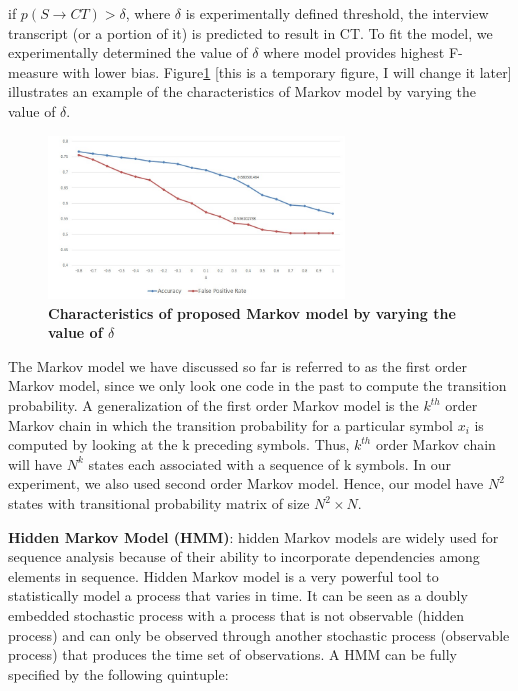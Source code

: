 \documentclass{amia}
\begin{document}
if $p(S\rightarrow CT) > \delta $, where $\delta$ is experimentally defined threshold, the interview transcript (or a portion of it) is predicted to result in CT. To fit the model, we experimentally determined the value of $\delta$ where model provides highest F-measure with lower bias. Figure\ref{fig:delta} [this is a temporary figure, I will change it later] illustrates an example of the characteristics of Markov model by varying the value of $\delta$. 

\begin{figure}[htb!]
    \centering
    \includegraphics[width=0.70\textwidth]{figures/deltadata.png}
    \caption{\textbf{Characteristics of proposed Markov model by varying the value of $\delta$}}
    \label{fig:delta}
\end{figure}

The Markov model we have discussed so far is referred to as the first order Markov model, since we only look one code in the past to compute the transition probability. A generalization of the first order Markov model is the $k^{th}$ order Markov chain in which the transition probability for a particular symbol $x_i$ is computed by looking at the k preceding symbols. Thus, $k^{th}$ order Markov chain will have $N^{k}$ states each associated with a sequence of k symbols. In our experiment, we also used second order Markov model. Hence, our model have $N^2$ states with transitional probability matrix of size $N^2 \times N$.  

\textbf {Hidden Markov Model (HMM)}: hidden Markov models are widely used for sequence analysis because of their ability to incorporate dependencies among elements in sequence. Hidden Markov model is a very
powerful tool to statistically model a process that varies in time. It can be seen as a doubly embedded stochastic process with a process that is not observable (hidden process) and can only be observed through another stochastic process (observable process) that produces the time set of observations. A HMM can be fully specified by the following quintuple:
\end{document}
